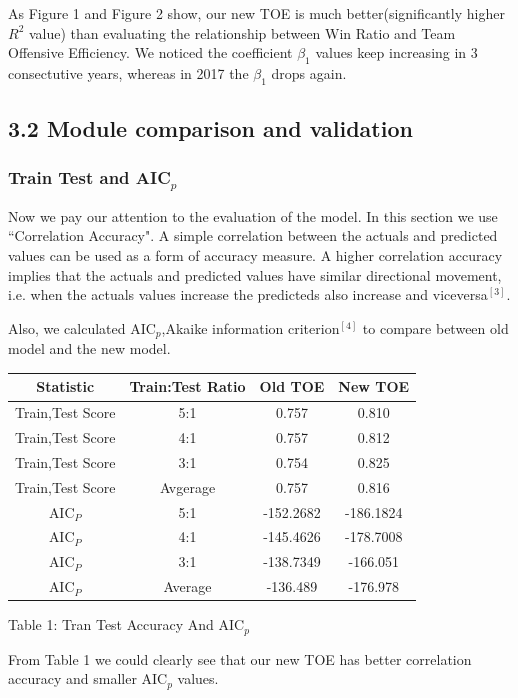\documentclass[11pt]{article}
\begin{document}
As Figure 1 and Figure 2 show, our new TOE is much better(significantly higher $R^2$ value) than evaluating the relationship between Win Ratio and Team Offensive Efficiency. We noticed the coefficient $\beta_1$ values keep increasing in 3 consectutive years, whereas in 2017 the $\beta_1$
drops again.

\newpage
\subsection*{3.2 Module comparison and validation}
\subsubsection*{Train Test and AIC$_p$}
Now we pay our attention to the evaluation of the model.
In this section we use ``Correlation Accuracy". A simple correlation between the actuals and predicted values can be used as a form of accuracy measure. A higher correlation accuracy implies that the actuals and predicted values have similar directional movement, i.e. when the actuals values increase the predicteds also increase and viceversa$^{[3]}$.

Also, we calculated AIC$_p$,Akaike information criterion$^{[4]}$ to compare between old model and the new model.

\begin{center}
\begin{tabular}{|c|c|c|c|}
\hline
Statistic & Train:Test Ratio& Old TOE & New TOE\\
\hline
Train,Test Score & 5:1 & 0.757 & 0.810\\
Train,Test Score & 4:1 & 0.757 & 0.812\\ 
Train,Test Score & 3:1 & 0.754 & 0.825\\ 
\hline
Train,Test Score & Avgerage& 0.757 & 0.816\\
\hline 
AIC$_P$& 5:1 & -152.2682 & -186.1824 \\
AIC$_P$& 4:1 & -145.4626 & -178.7008 \\
AIC$_P$& 3:1 & -138.7349 & -166.051 \\
\hline
AIC$_P$& Average & -136.489 & -176.978 \\
\hline
\end{tabular}

\bigskip
Table 1: Tran Test Accuracy And AIC$_p$
\end{center}
From Table 1 we could clearly see that our new TOE has better correlation accuracy and smaller AIC$_p$ values.
\end{document}
